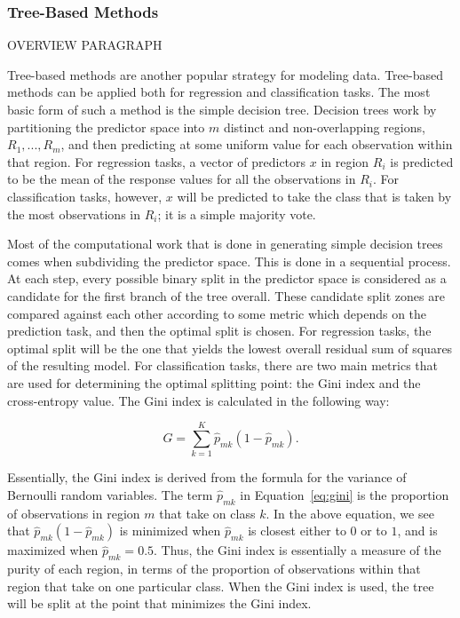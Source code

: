\documentclass[12pt]{article}
\begin{document}
\subsubsection{Tree-Based Methods}
\label{sec:tbm}

OVERVIEW PARAGRAPH

Tree-based methods are another popular strategy for modeling data.  Tree-based 
methods can be applied both for regression and classification tasks.  The most 
basic form of such a method is the simple decision tree.  Decision trees work 
by partitioning the predictor space into $m$ distinct and non-overlapping 
regions, $R_1, ... , R_m$, and then predicting at some uniform value for each 
observation within that region.  For regression tasks, a vector of predictors 
$x$ in region $R_i$ is predicted to be the mean of the response values for all 
the observations in $R_i$.  For classification tasks, however, $x$ will be 
predicted to take the class that is taken by the most observations in $R_i$; 
it is a simple majority vote.  

Most of the computational work that is done in generating simple decision trees 
comes when subdividing the predictor space.  This is done in a sequential process.  
At each step, every possible binary split in the predictor space is considered as 
a candidate for the first branch of the tree overall.  These candidate split zones 
are compared against each other according to some metric which depends on the 
prediction task, and then the optimal split is chosen.  For regression tasks, the 
optimal split will be the one that yields the lowest overall residual sum of 
squares of the resulting model.  For classification tasks, there are two main 
metrics that are used for determining the optimal splitting point: the Gini index 
and the cross-entropy value.  The Gini index is calculated in the following way:

\begin{equation}
  \label{eq:gini}
   G = \sum_{k = 1} ^ {K} \hat{p}_{mk} (1 - \hat{p}_{mk}).
\end{equation} 

Essentially, the Gini index is derived from the formula for the variance of 
Bernoulli random variables.  The term $\hat{p}_{mk}$ in Equation~\eqref{eq:gini} 
is the proportion of observations in region $m$ that take on class $k$.  In the 
above equation, we see that 
$\hat{p}_{mk} (1 - \hat{p}_{mk})$ is minimized when $\hat{p}_{mk}$ is closest 
either to $0$ or to $1$, and is maximized when $\hat{p}_{mk} = 0.5$.  Thus, the 
Gini index is essentially a measure of the purity of each region, in terms of the 
proportion of observations within that region that take on one particular class.  
When the Gini index is used, the tree will be split at the point that minimizes 
the Gini index.  
\end{document}
